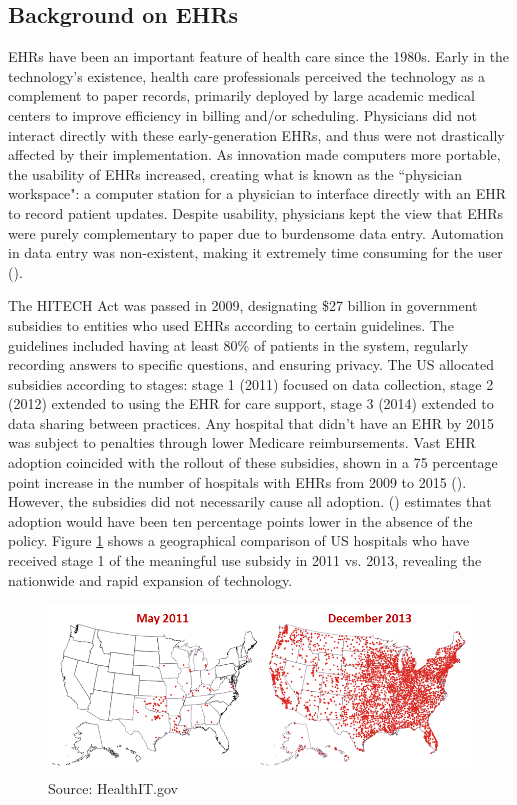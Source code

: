 \documentclass[12pt]{article}
\begin{document}
\subsection{Background on EHRs}
EHRs have been an important feature of health care since the 1980s. Early in the technology's existence, health care professionals perceived the technology as a complement to paper records, primarily deployed by large academic medical centers to improve efficiency in billing and/or scheduling. Physicians did not interact directly with these early-generation EHRs, and thus were not drastically affected by their implementation. As innovation made computers more portable, the usability of EHRs increased, creating what is known as the ``physician workspace": a computer station for a physician to interface directly with an EHR to record patient updates. Despite usability, physicians kept the view that EHRs were purely complementary to paper due to burdensome data entry. Automation in data entry was non-existent, making it extremely time consuming for the user (\cite{evans2016electronic}). 

The HITECH Act was passed in 2009, designating \$27 billion in government subsidies to entities who used EHRs according to certain guidelines. The guidelines included having at least 80\% of patients in the system, regularly recording answers to specific questions, and ensuring privacy. The US allocated subsidies according to stages: stage 1 (2011) focused on data collection, stage 2 (2012) extended to using the EHR for care support, stage 3 (2014) extended to data sharing between practices. Any hospital that didn't have an EHR by 2015 was subject to penalties through lower Medicare reimbursements. Vast EHR adoption coincided with the rollout of these subsidies, shown in a 75 percentage point increase in the number of hospitals with EHRs from 2009 to 2015 (\cite{stats}). However, the subsidies did not necessarily cause all adoption. \citeauthor{dranove2015investment} (\citeyear{dranove2015investment}) estimates that adoption would have been ten percentage points lower in the absence of the policy. Figure \ref{fig:meanuse} shows a geographical comparison of US hospitals who have received stage 1 of the meaningful use subsidy in 2011 vs. 2013, revealing the nationwide and rapid expansion of technology. 

\begin{figure}[ht]
    \centering
    \captionsetup{width=.6\linewidth}
    \caption{Hospitals Receiving Meaningful Use Stage 1 Subsidy}
    \includegraphics[scale=.5]{graphics/QS-Hospitals-Receiving-Payments-for-MU-and-Adoption.png}
    \caption*{Source: HealthIT.gov}
    \label{fig:meanuse}
\end{figure}
\end{document}
